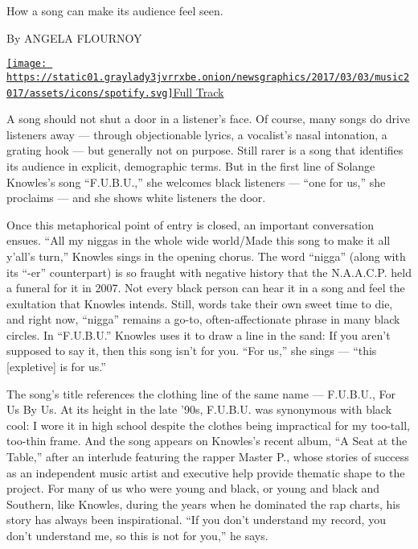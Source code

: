 How a song can make its audience feel seen.

By ANGELA FLOURNOY

\href{https://open.spotify.com/track/2aR6SYRJxy2QsBxA459ATF}{\texttt{[image: https://static01.graylady3jvrrxbe.onion/newsgraphics/2017/03/03/music2017/assets/icons/spotify.svg]}Full
Track}

A song should not shut a door in a listener's face. Of course, many
songs do drive listeners away --- through objectionable lyrics, a
vocalist's nasal intonation, a grating hook --- but generally not on
purpose. Still rarer is a song that identifies its audience in explicit,
demographic terms. But in the first line of Solange Knowles's song
``F.U.B.U.,'' she welcomes black listeners --- ``one for us,'' she
proclaims --- and she shows white listeners the door.

Once this metaphorical point of entry is closed, an important
conversation ensues. ``All my niggas in the whole wide world/Made this
song to make it all y'all's turn,'' Knowles sings in the opening chorus.
The word ``nigga'' (along with its ``-er'' counterpart) is so fraught
with negative history that the N.A.A.C.P. held a funeral for it in 2007.
Not every black person can hear it in a song and feel the exultation
that Knowles intends. Still, words take their own sweet time to die, and
right now, ``nigga'' remains a go-to, often-affectionate phrase in many
black circles. In ``F.U.B.U.'' Knowles uses it to draw a line in the
sand: If you aren't supposed to say it, then this song isn't for you.
``For us,'' she sings --- ``this {[}expletive{]} is for us.''

The song's title references the clothing line of the same name ---
F.U.B.U., For Us By Us. At its height in the late '90s, F.U.B.U. was
synonymous with black cool: I wore it in high school despite the clothes
being impractical for my too-tall, too-thin frame. And the song appears
on Knowles's recent album, ``A Seat at the Table,'' after an interlude
featuring the rapper Master P., whose stories of success as an
independent music artist and executive help provide thematic shape to
the project. For many of us who were young and black, or young and black
and Southern, like Knowles, during the years when he dominated the rap
charts, his story has always been inspirational. ``If you don't
understand my record, you don't understand me, so this is not for you,''
he says.

